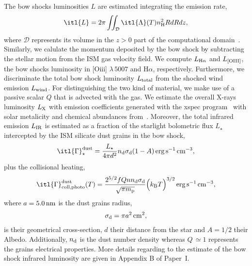 \documentclass[useAMS,usenatbib]{mn2e}
\begin{document}
The bow shocks luminosities $L$ are estimated integrating the emission rate,
%
\begin{equation}
	\itl{ L} = 2\pi \iint_{\mathcal D} \itl{\Lambda}(T) n_{\rm H}^{2} R dRdz,
\label{eq:bslum}
\end{equation}
%
where $\mathcal D$ represents its volume in the $z>0$ part of the 
computational domain~\citep[][Paper~I]{mohamed_aa_541_2012}. Similarly, we calulate
the momentum deposited by the bow shock \textcolor{black}{by}
subtracting the stellar motion from the ISM gas velocity field. 
We compute $L_{\rm H\alpha}$ and $L_{[\rm OIII]}$, the bow
shocks luminosity in [O{\sc iii}] $\lambda \,
5007$ and H$\alpha$, respectively. Furthermore, we
discriminate the total bow shock luminosity $L_{\rm total}$ from the shocked
wind emission $L_{\rm wind}$. For distinguishing the two kind 
of material, we make use of a passive scalar $Q$ that is advected with
the gas. We estimate the overall X-rays luminosity $L_{\rm X}$ with emission coefficients
generated with the {\sc xspec} program~\citep{arnaud_aspc_101_1996} with solar 
metalicity and chemical abundances from~\citet{asplund_araa_47_2009}. Moreover, 
the total infrared emission $L_{\rm IR}$ is estimated as a fraction of the 
starlight bolometric flux $L_{\star}$~\citep{brott_aa_530_2011a} intercepted by 
the ISM silicate dust grains in the bow shock,  
%
\begin{equation}
	\itl{ \Gamma}_{\star}^{\rm dust} = 
	\frac{L_{\star}}{ 4\pi d^{2} }n_{\rm d}\sigma_{\rm d}(1-A)\, \rm erg\, s^{-1}\, cm^{-3},
\label{eq:radlum}
\end{equation}
%
plus the collisional heating,
%
\begin{equation}
	\itl{\Gamma}_{\rm coll,photo}^{\rm dust}(T) = \frac{ 2^{5/2} f Q 
	n n_{\rm d} \sigma_{\rm d} }{ \sqrt{\pi m_{\rm p}} } \Big( k_{\rm B}T \Big)^{3/2} \, \rm erg\, s^{-1}\, cm^{-3},
\label{eq:dustheathot}
\end{equation}
%
where $a=5.0\, \rm nm$ is the dust grains radius, 
%
\begin{equation}
  \sigma_{\rm d}=\pi a^{2}\, \rm cm^{2},
  \label{eq:crosssection}
\end{equation}
%
is their geometrical cross-section, $d$ their distance from the star and 
$A=1/2$ their Albedo. Additionally,  $n_{\rm d}$ is the dust number density 
whereas $Q\, \simeq 1$ represents the grains electrical properties. More 
details regarding to the estimate of the bow shock infrared luminosity are given in 
Appendix B of Paper~I. 
\end{document}
